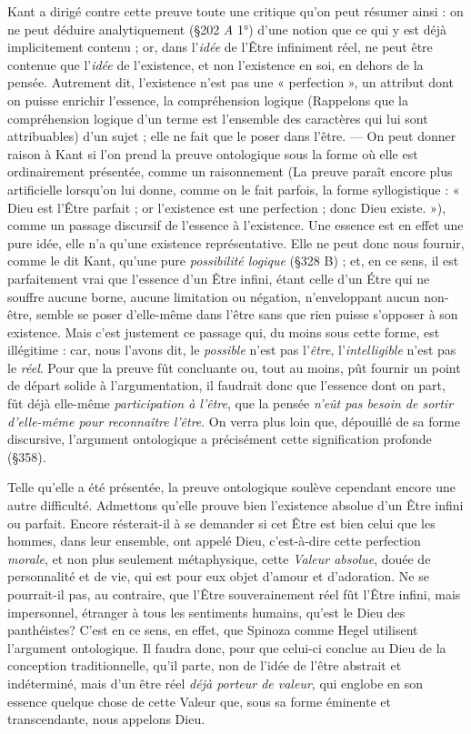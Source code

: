 {Kant a dirigé contre cette preuve toute une critique qu’on peut résumer
ainsi : on ne peut déduire analytiquement (\S 202 {\it A} 1°) d’une notion
que ce qui y est déjà implicitement contenu ; or, dans l’{\it idée} de l’Être
infiniment réel, ne peut être contenue que l’{\it idée} de l’existence, et non
l'existence en soi, en dehors de la pensée. Autrement dit, l'existence n’est
pas une « perfection », un attribut dont on puisse enrichir l'essence, la
compréhension logique
{\scriptsize (Rappelons que la compréhension logique d’un terme est l’ensemble des caractères
qui lui sont attribuables)}
d’un sujet ; elle ne fait que le poser dans l'être. —
On peut donner raison à Kant si l’on prend la preuve ontologique sous la
forme où elle est ordinairement présentée, comme un raisonnement
{\scriptsize (La preuve paraît encore plus artificielle lorsqu'on lui donne, comme on le fait
parfois, la forme syllogistique : « Dieu est l’Être parfait ; or l'existence est une perfection ;
donc Dieu existe. »)},
comme un passage discursif de l'essence à l'existence. Une essence est en
effet une pure idée, elle n’a qu’une existence représentative. Elle ne peut
donc nous fournir, comme le dit Kant, qu’une pure {\it possibilité logique}
(\S 328 B) ; et, en ce sens, il est parfaitement vrai que l’essence d’un Être
infini, étant celle d’un Étre qui ne souffre aucune borne, aucune limitation
ou négation, n’enveloppant aucun non-être, semble se poser d'elle-même dans
l’être sans que rien puisse s'opposer à son existence. Mais c’est justement ce
passage qui, du moins sous cette forme, est illégitime : car, nous l’avons dit,
le {\it possible} n’est pas l'{\it être}, l’{\it intelligible} n’est pas le {\it réel}. Pour que la preuve
fût concluante ou, tout au moins, pût fournir un point de départ solide à
l'argumentation, il faudrait donc que l'essence dont on part, fût déjà elle-même
{\it participation à l'être}, que la pensée {\it n’eût pas besoin de sortir d’elle-même
pour reconnaître l'être}. On verra plus loin que, dépouillé de sa forme
discursive, l’argument ontologique a précisément cette signification profonde (\S 358).

Telle qu’elle a été présentée, la preuve ontologique soulève cependant
encore une autre difficulté. Admettons qu'elle prouve bien l'existence
absolue d’un Être infini ou parfait. Encore résterait-il à se demander si cet
Être est bien celui que les hommes, dans leur ensemble, ont appelé Dieu,
c’est-à-dire cette perfection {\it morale}, et non plus seulement métaphysique,
cette {\it Valeur absolue}, douée de personnalité et de vie, qui est pour eux
objet d'amour et d’adoration. Ne se pourrait-il pas, au contraire, que l’Être
souverainement réel fût l’Être infini, mais impersonnel, étranger à tous les
sentiments humains, qu'est le Dieu des panthéistes? C’est en ce sens, en
effet, que Spinoza comme Hegel utilisent l'argument ontologique. Il faudra
donc, pour que celui-ci conclue au Dieu de la conception traditionnelle,
qu'il parte, non de l’idée de l’être abstrait et indéterminé, mais d’un être
réel {\it déjà porteur de valeur}, qui englobe en son essence quelque chose de cette
Valeur que, sous sa forme éminente et transcendante, nous appelons Dieu.

}
